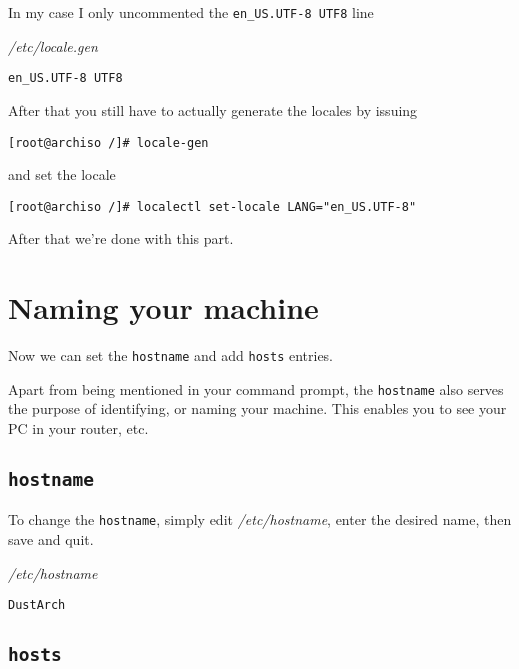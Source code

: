 \documentclass[10pt]{dustdoc}
\begin{document}
In my case I only uncommented the \texttt{en\_US.UTF-8 UTF8} line

\begin{mintedlisting}
    \caption*{\textit{/etc/locale.gen}}
    \begin{verbatim}
en_US.UTF-8 UTF8
    \end{verbatim}
\end{mintedlisting}

After that you still have to actually generate the locales by issuing

\begin{verbatim}
[root@archiso /]# locale-gen
\end{verbatim}

\noindent
and set the locale

\begin{verbatim}
[root@archiso /]# localectl set-locale LANG="en_US.UTF-8"
\end{verbatim}

After that we’re done with this part.

\section{Naming your machine}
\label{sec:naming-your-machine}

Now we can set the \texttt{hostname} and add \texttt{hosts} entries.

Apart from being mentioned in your command prompt, the \texttt{hostname} also serves the purpose of identifying, or naming your machine.
This enables you to see your PC in your router, etc.

\subsection{\texttt{hostname}}
\label{sec:hostname}

To change the \texttt{hostname}, simply edit \textit{/etc/hostname}, enter the desired name, then save and quit.

\begin{mintedlisting}
    \caption*{\textit{/etc/hostname}}
    \begin{verbatim}
DustArch
    \end{verbatim}
\end{mintedlisting}

\subsection{\texttt{hosts}}
\label{sec:hosts}
\end{document}

